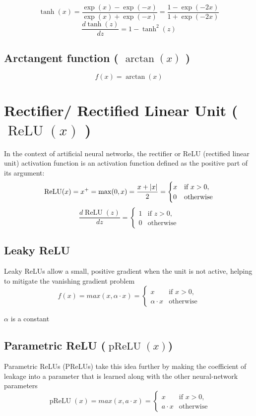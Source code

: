\[
    \tanh(x)
    =\dfrac {\exp({x})-\exp({-x})}{\exp({x})+\exp({-x})} 
    = \frac{1 - \exp(-2x)}{1 + \exp(-2x)}
\]
\[
    \dfrac{d\tanh(z)}{dz} = 1-\tanh^2(z)
\]


\subsection{Arctangent function ( $\arctan(x)$ ) \cite{wiki-Inverse_trigonometric_functions}}
\[
    f(x)=\arctan(x)
\]


\section{Rectifier/ Rectified Linear Unit ( $\operatorname{ReLU}(x)$ ) \cite{wiki-Rectifier,dnn-1}}\label{ReLU}
In the context of artificial neural networks, the rectifier or ReLU (rectified linear unit) activation function is an activation function defined as the positive part of its argument:
\[
    \operatorname{ReLU}(x)=x^{+}=\max(0,x)={\dfrac {x+\left| x \right|}{2}}={\begin{cases}x&{\text{if }}x>0,\\0&{\text{otherwise}}\end{cases}}
\]
\[
    \dfrac{d\operatorname{ReLU}(z)}{dz}={\begin{cases}1&{\text{if }}z>0,\\0&{\text{otherwise}}\end{cases}}
\]

\subsection{Leaky ReLU \cite{wiki-Rectifier}}\label{Leaky ReLU}
Leaky ReLUs allow a small, positive gradient when the unit is not active, helping to mitigate the vanishing gradient problem
\[
    f(x)=max(x, \alpha\cdot x)={\begin{cases}x&{\text{if }}x>0,\\\alpha\cdot x&{\text{otherwise}}\end{cases}} 
\]

$\alpha$ is a constant

\subsection{Parametric ReLU ($\operatorname{pReLU}(x)$) \cite{wiki-Rectifier,dnn-1}} \label{Parametric ReLU (PReLU)}
Parametric ReLUs (PReLUs) take this idea further by making the coefficient of leakage into a parameter that is learned along with the other neural-network parameters
\[
    \operatorname{pReLU}(x)=max(x, a\cdot x)={\begin{cases}x&{\text{if }}x>0,\\a\cdot x&{\text{otherwise}}\end{cases}}
\]

